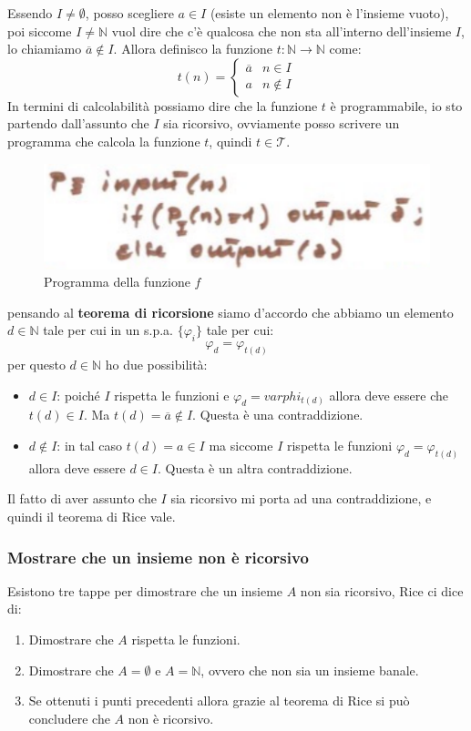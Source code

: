 \documentclass{article}
\begin{document}
Essendo $I\neq\emptyset$, posso scegliere $a\in I$ (esiste un elemento
non è l'insieme vuoto), poi siccome $I\neq\mathbb{N}$ vuol dire che c'è qualcosa che non
sta all'interno dell'insieme $I$, lo chiamiamo $\overline{a}\notin I$.
Allora definisco la funzione $t:\mathbb{N}\rightarrow\mathbb{N}$ come:
\[
    t(n)=
    \begin{cases}
        \overline{a} & n\in I    \\
        a            & n\notin I
    \end{cases}
\]
In termini di calcolabilità possiamo dire che la funzione $t$ è programmabile,
io sto partendo dall'assunto che $I$ sia ricorsivo, ovviamente posso scrivere un
programma che calcola la funzione $t$, quindi $t\in\mathcal{T}$.
\begin{figure}[H]
    \centering
    \includegraphics[scale=0.6]{images/appartenenza.png}
    \caption{Programma della funzione $f$}
\end{figure}
pensando al \textbf{teorema di ricorsione} siamo d'accordo che abbiamo un elemento $d\in\mathbb{N}$
tale per cui in un s.p.a. $\{\varphi_i\}$ tale per cui:
$$\varphi_d=\varphi_{t(d)}$$
per questo $d\in\mathbb{N}$ ho due possibilità:
\begin{itemize}
    \item $d\in I$: poiché $I$ rispetta le funzioni e $\varphi_d=varphi_{t(d)}$ allora deve
          essere che $t(d)\in I$. Ma $t(d)=\overline{a}\notin I$. Questa è una contraddizione.

    \item $d\notin I$: in tal caso $t(d)=a\in I$ ma siccome $I$ rispetta le funzioni
          $\varphi_d=\varphi_{t(d)}$ allora deve essere $d\in I$. Questa è un altra contraddizione.
\end{itemize}
Il fatto di aver assunto che $I$ sia ricorsivo mi porta ad una contraddizione, e quindi il
teorema di Rice vale.
\subsubsection{Mostrare che un insieme non è ricorsivo}
Esistono tre tappe per dimostrare che un insieme $A$ non sia ricorsivo, Rice ci dice di:
\begin{enumerate}
    \item Dimostrare che $A$ rispetta le funzioni.
    \item Dimostrare che $A=\emptyset$ e $A=\mathbb{N}$, ovvero che non sia un insieme banale.
    \item Se ottenuti i punti precedenti allora grazie al teorema di Rice si può concludere che
          $A$ non è ricorsivo.
\end{enumerate}
\end{document}
